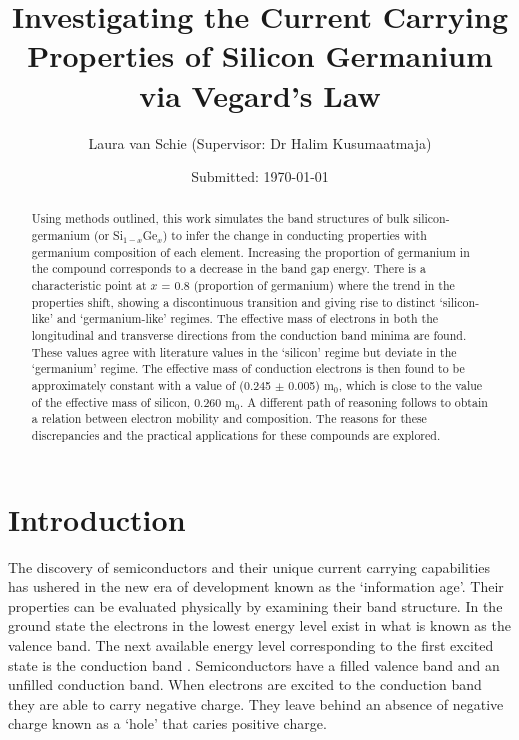 \documentclass[10pt, twocolumn]{revtex4}    %
\begin{document}
\title{Investigating the Current Carrying Properties of Silicon Germanium via Vegard's Law}
\date{Submitted: \today{}}
\author{Laura van Schie (Supervisor: Dr Halim Kusumaatmaja)}

\begin{abstract}

Using methods outlined, this work simulates the band structures of bulk silicon-germanium (or Si$_{1-x}$Ge$_x$) to infer the change in conducting properties with germanium composition of each element. Increasing the proportion of germanium in the compound corresponds to a decrease in the band gap energy. There is a characteristic point at $x$ = 0.8 (proportion of germanium) where the trend in the properties shift, showing a discontinuous transition and giving rise to distinct `silicon-like' and `germanium-like' regimes. The effective mass of electrons in both the longitudinal and transverse directions from the conduction band minima are found. These values agree with literature values in the `silicon' regime but deviate in the `germanium' regime. The effective mass of conduction electrons is then found to be approximately constant with a value of (0.245 $\pm$ 0.005) m$_0$, which is close to the value of the effective mass of silicon, 0.260 m$_0$. A different path of reasoning follows to obtain a relation between electron mobility and composition. The reasons for these discrepancies and the practical applications for these compounds are explored.

\end{abstract}

\maketitle
\thispagestyle{plain} %



\section{Introduction}


The discovery of semiconductors and their unique current carrying capabilities has ushered in the new era of development known as the `information age'. Their properties can be evaluated physically by examining their band structure. In the ground state the electrons in the lowest energy level exist in what is known as the valence band. The next available energy level corresponding to the first excited state is the conduction band \cite{ref01}.  Semiconductors have a filled valence band and an unfilled conduction band. When electrons are excited to the conduction band they are able to carry negative charge. They leave behind an absence of negative charge known as a `hole' that caries positive charge.\\
\end{document}
